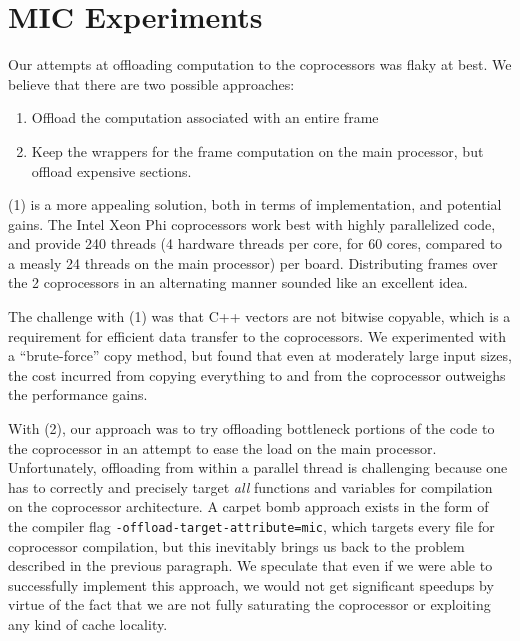 \documentclass{scrartcl}
\begin{document}
  \section{MIC Experiments}
  Our attempts at offloading computation to the coprocessors was flaky at best. We believe that there are two possible approaches:

  \begin{enumerate}
    \item Offload the computation associated with an entire frame
    \item Keep the wrappers for the frame computation on the main processor, but offload expensive sections.
  \end{enumerate}

  (1) is a more appealing solution, both in terms of implementation, and potential gains. The Intel Xeon Phi coprocessors work best with highly parallelized code, and provide 240 threads (4 hardware threads per core, for 60 cores, compared to a measly 24 threads on the main processor) per board. Distributing frames over the 2 coprocessors in an alternating manner sounded like an excellent idea.

  The challenge with (1) was that C++ vectors are not bitwise copyable, which is a requirement for efficient data transfer to the coprocessors. We experimented with a ``brute-force'' copy method, but found that even at moderately large input sizes, the cost incurred from copying everything to and from the coprocessor outweighs the performance gains.

  With (2), our approach was to try offloading bottleneck portions of the code to the coprocessor in an attempt to ease the load on the main processor. Unfortunately, offloading from within a parallel thread is challenging because one has to correctly and precisely target \emph{all} functions and variables for compilation on the coprocessor architecture. A carpet bomb approach exists in the form of the compiler flag \texttt{-offload-target-attribute=mic}, which targets every file for coprocessor compilation, but this inevitably brings us back to the problem described in the previous paragraph. We speculate that even if we were able to successfully implement this approach, we would not get significant speedups by virtue of the fact that we are not fully saturating the coprocessor or exploiting any kind of cache locality.
\end{document}
